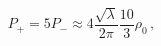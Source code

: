 \begin{equation}
P_+ = 5 P_- \approx 4 \frac{\sqrt{ \lambda }}{2\pi} \frac{10}{3}\rho_0\,,
\end{equation}

